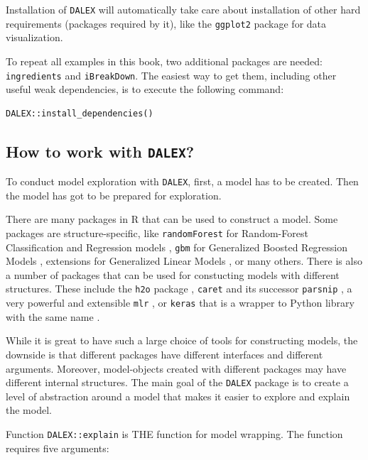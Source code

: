 \documentclass[12pt,]{krantz}
\begin{document}
Installation of \texttt{DALEX} will automatically take care about installation of other hard requirements (packages required by it), like the \texttt{ggplot2} package for data visualization.

To repeat all examples in this book, two additional packages are needed: \texttt{ingredients} and \texttt{iBreakDown}. The easiest way to get them, including other useful weak dependencies, is to execute the following command:

\begin{verbatim}
DALEX::install_dependencies()
\end{verbatim}

\hypertarget{how-to-work-with-dalex}{%
\subsection{\texorpdfstring{How to work with \texttt{DALEX}?}{How to work with DALEX?}}\label{how-to-work-with-dalex}}

To conduct model exploration with \texttt{DALEX}, first, a model has to be created. Then the model has got to be prepared for exploration.

There are many packages in R that can be used to construct a model. Some packages are structure-specific, like \texttt{randomForest} for Random-Forest Classification and Regression models \citep{randomForest}, \texttt{gbm} for Generalized Boosted Regression Models \citep{gbm}, extensions for Generalized Linear Models \citep{rms}, or many others. There is also a number of packages that can be used for constucting models with different structures. These include the \texttt{h2o} package \citep{h2oPackage}, \texttt{caret} \citep{caret} and its successor \texttt{parsnip} \citep{parsnipPackage}, a very powerful and extensible \texttt{mlr} \citep{mlr}, or \texttt{keras} that is a wrapper to Python library with the same name \citep{kerasPackage}.

While it is great to have such a large choice of tools for constructing models, the downside is that different packages have different interfaces and different arguments. Moreover, model-objects created with different packages may have different internal structures. The main goal of the \texttt{DALEX} package \citep{R-DALEX} is to create a level of abstraction around a model that makes it easier to explore and explain the model.

Function \texttt{DALEX::explain} is THE function for model wrapping. The function requires five arguments:
\end{document}
